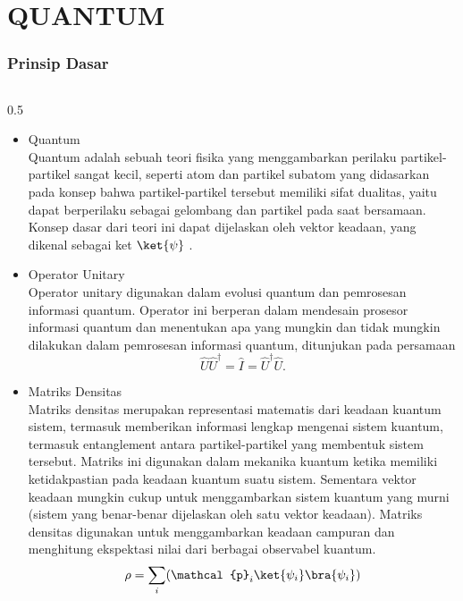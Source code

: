 \section{QUANTUM} %

\begin{frame}
\frametitle{Prinsip Dasar}
    \begin{columns}
        \begin{column}{0.5\textwidth}
            \begin{itemize}
            \tiny \justifying
                \item Quantum\\
                    Quantum adalah sebuah teori fisika yang menggambarkan perilaku partikel-partikel sangat kecil, seperti atom dan partikel subatom yang didasarkan pada konsep bahwa partikel-partikel tersebut memiliki sifat dualitas, yaitu dapat berperilaku sebagai gelombang dan partikel pada saat bersamaan.  Konsep dasar dari teori ini dapat dijelaskan oleh vektor keadaan, yang dikenal sebagai ket \(\ket{\psi}\) \cite{barnett2009quantum}.
                \item  Operator Unitary\\
                    Operator unitary digunakan dalam evolusi quantum dan pemrosesan informasi quantum. Operator ini berperan dalam mendesain prosesor informasi quantum dan menentukan apa yang mungkin dan tidak mungkin dilakukan dalam pemrosesan informasi quantum, ditunjukan pada persamaan
                        \begin{equation}
                        \hat{U} \hat{U}^\dagger = \hat{I} = \hat{U}^\dagger \hat{U} .
                        \end{equation}
                \item Matriks Densitas\\
                    Matriks densitas merupakan representasi matematis dari keadaan kuantum sistem, termasuk memberikan informasi lengkap mengenai sistem kuantum, termasuk entanglement antara partikel-partikel yang membentuk sistem tersebut. Matriks ini digunakan dalam mekanika kuantum ketika memiliki ketidakpastian pada keadaan kuantum suatu sistem. Sementara vektor keadaan mungkin cukup untuk menggambarkan sistem kuantum yang murni (sistem yang benar-benar dijelaskan oleh satu vektor keadaan). Matriks densitas  digunakan untuk menggambarkan keadaan campuran dan menghitung ekspektasi nilai dari berbagai observabel kuantum.
                        \begin{equation}
                            \rho=\sum_{i}(\mathcal{p}_i\ket{\psi_i}\bra{\psi_i})
                        \end{equation}
            \end{itemize}
        \end{column}
    

\end{columns}
\end{frame}
